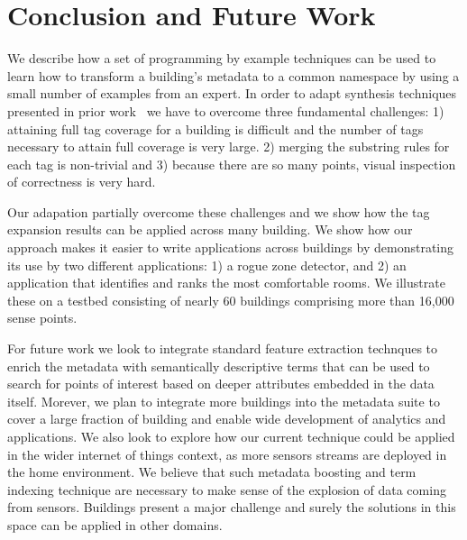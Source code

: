 \section{Conclusion and Future Work}

We describe how a set of programming by example techniques can be used to
learn how to transform a building's metadata 
to a common namespace by using a small number of examples from an expert. 
In order to adapt synthesis techniques presented in prior work~\cite{Gulwani:2011} 
we have to overcome
three fundamental challenges: 1) attaining full tag coverage for a building
is difficult and the number of tags necessary to attain full coverage is very large.
2) merging the substring rules for each tag is non-trivial and 3) because there are so
many points, visual inspection of correctness is very hard.

Our adapation partially overcome these challenges and we show how the tag expansion results can
be applied across many building.
We show how our approach makes it easier to write applications across buildings by
demonstrating its use by two different applications: 1) a rogue zone detector, and 
2) an application that identifies and ranks the most comfortable
rooms. We illustrate these on a testbed consisting of nearly 60 buildings comprising more 
than 16,000 sense points. 





For future work we look to integrate standard feature extraction technques to enrich the metadata
with semantically descriptive terms that can be used to search for points of interest based on
deeper attributes embedded in the data itself.  Morever, we plan to integrate more buildings
into the metadata suite to cover a large fraction of building and enable wide development
of analytics and applications.  We also look to explore how our current technique could be applied in the 
wider internet of things context, as more sensors streams are deployed in the home environment.
We believe that such metadata boosting and term indexing technique are necessary to make sense of
the explosion of data coming from sensors.  Buildings present a major challenge and surely the solutions
in this space can be applied in other domains.



